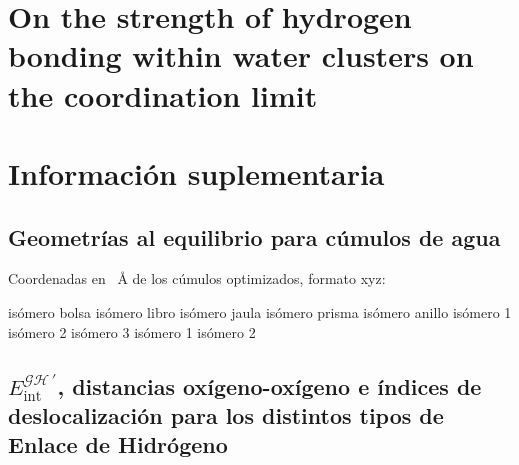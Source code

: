 \appendix
\renewcommand{\thetable}{IS\arabic{table}}%

\chapter{On the strength of hydrogen bonding within water clusters on the coordination limit}\label{paper2020}



\chapter{Información suplementaria}

\section{Geometrías al equilibrio para cúmulos de agua}

Coordenadas en \SI{}{\angstrom} de los cúmulos optimizados, formato xyz:

{\renewcommand{\baselinestretch}{.5}
\scriptsize{
\noindent {} isómero bolsa
\noindent  {} isómero libro
\newpage
\noindent {} isómero jaula
 isómero prisma
 isómero anillo
 isómero 1
 isómero 2
 isómero 3
 isómero 1
 isómero 2
\newpage
\noindent {}
\noindent {}
\newpage
\noindent {}
}
}
\normalsize
\newpage

\section{$E_{\mathrm{int}}^{\mathscr{GH}\, \prime}$, distancias oxígeno-oxígeno
e índices de deslocalización para los distintos tipos de Enlace de Hidrógeno}

